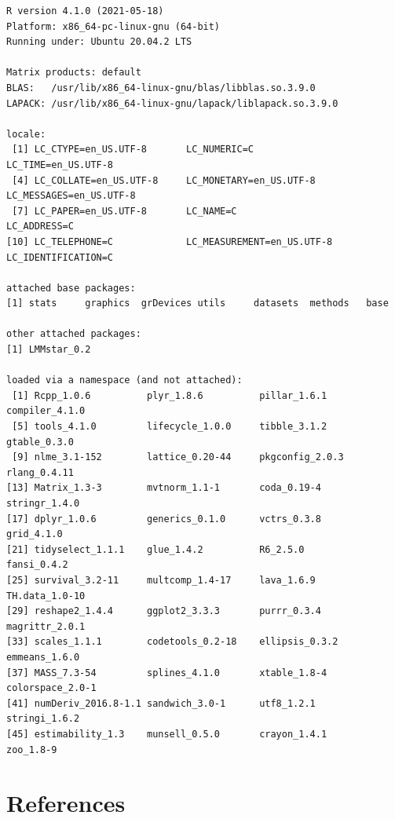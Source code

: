 \documentclass[12pt]{article}
\begin{document}
\begin{verbatim}
R version 4.1.0 (2021-05-18)
Platform: x86_64-pc-linux-gnu (64-bit)
Running under: Ubuntu 20.04.2 LTS

Matrix products: default
BLAS:   /usr/lib/x86_64-linux-gnu/blas/libblas.so.3.9.0
LAPACK: /usr/lib/x86_64-linux-gnu/lapack/liblapack.so.3.9.0

locale:
 [1] LC_CTYPE=en_US.UTF-8       LC_NUMERIC=C               LC_TIME=en_US.UTF-8       
 [4] LC_COLLATE=en_US.UTF-8     LC_MONETARY=en_US.UTF-8    LC_MESSAGES=en_US.UTF-8   
 [7] LC_PAPER=en_US.UTF-8       LC_NAME=C                  LC_ADDRESS=C              
[10] LC_TELEPHONE=C             LC_MEASUREMENT=en_US.UTF-8 LC_IDENTIFICATION=C       

attached base packages:
[1] stats     graphics  grDevices utils     datasets  methods   base     

other attached packages:
[1] LMMstar_0.2

loaded via a namespace (and not attached):
 [1] Rcpp_1.0.6          plyr_1.8.6          pillar_1.6.1        compiler_4.1.0     
 [5] tools_4.1.0         lifecycle_1.0.0     tibble_3.1.2        gtable_0.3.0       
 [9] nlme_3.1-152        lattice_0.20-44     pkgconfig_2.0.3     rlang_0.4.11       
[13] Matrix_1.3-3        mvtnorm_1.1-1       coda_0.19-4         stringr_1.4.0      
[17] dplyr_1.0.6         generics_0.1.0      vctrs_0.3.8         grid_4.1.0         
[21] tidyselect_1.1.1    glue_1.4.2          R6_2.5.0            fansi_0.4.2        
[25] survival_3.2-11     multcomp_1.4-17     lava_1.6.9          TH.data_1.0-10     
[29] reshape2_1.4.4      ggplot2_3.3.3       purrr_0.3.4         magrittr_2.0.1     
[33] scales_1.1.1        codetools_0.2-18    ellipsis_0.3.2      emmeans_1.6.0      
[37] MASS_7.3-54         splines_4.1.0       xtable_1.8-4        colorspace_2.0-1   
[41] numDeriv_2016.8-1.1 sandwich_3.0-1      utf8_1.2.1          stringi_1.6.2      
[45] estimability_1.3    munsell_0.5.0       crayon_1.4.1        zoo_1.8-9
\end{verbatim}

\clearpage

\section*{References}
\label{sec:org9b2df39}
\begingroup
\renewcommand{\section}[2]{}
\end{document}
